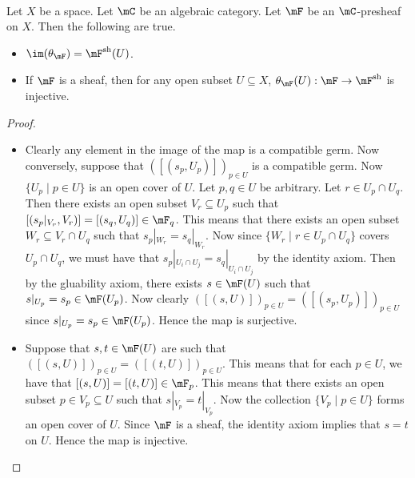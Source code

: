 \documentclass[a4paper]{article}
\begin{document}
\begin{lmm}{}{}\\
Let $X$ be a space. Let $\mC$ be an algebraic category. Let $\mF$ be an $\mC$-presheaf on $X$. Then the following are true. 
\begin{itemize}
\item $\im(\theta_\mF)=\mF^\text{sh}(U)$. 
\item If $\mF$ is a sheaf, then for any open subset $U\subseteq X$, $\theta_\mF(U):\mF\to\mF^\text{sh}$ is injective. 
\end{itemize}
\begin{proof}
\begin{itemize}
\item Clearly any element in the image of the map is a compatible germ. Now conversely, suppose that $([(s_p,U_p)])_{p\in U}$ is a compatible germ. Now $\{U_p\;|\;p\in U\}$ is an open cover of $U$. Let $p,q\in U$ be arbitrary. Let $r\in U_p\cap U_q$. Then there exists an open subset $V_r\subseteq U_p$ such that $[(s_p|_{V_r},V_r)]=[(s_q,U_q)]\in\mF_q$. This means that there exists an open subset $W_r\subseteq V_r\cap U_q$ such that $s_p|_{W_r}=s_q|_{W_r}$. Now since $\{W_r\;|\;r\in U_p\cap U_q\}$ covers $U_p\cap U_q$, we must have that $s_p|_{U_i\cap U_j}=s_q|_{U_i\cap U_j}$ by the identity axiom. Then by the gluability axiom, there exists $s\in\mF(U)$ such that $s|_{U_p}=s_p\in\mF(U_p)$. Now clearly $([(s,U)])_{p\in U}=([(s_p,U_p)])_{p\in U}$ since $s|_{U_p}=s_p\in\mF(U_p)$. Hence the map is surjective. 
\item Suppose that $s,t\in\mF(U)$ are such that $([(s,U)])_{p\in U}=([(t,U)])_{p\in U}$. This means that for each $p\in U$, we have that $[(s,U)]=[(t,U)]\in\mF_p$. This means that there exists an open subset $p\in V_p\subseteq U$ such that $s|_{V_p}=t|_{V_p}$. Now the collection $\{V_p\;|\;p\in U\}$ forms an open cover of $U$. Since $\mF$ is a sheaf, the identity axiom implies that $s=t$ on $U$. Hence the map is injective. 
\end{itemize}
\end{proof}
\end{lmm}
\end{document}
